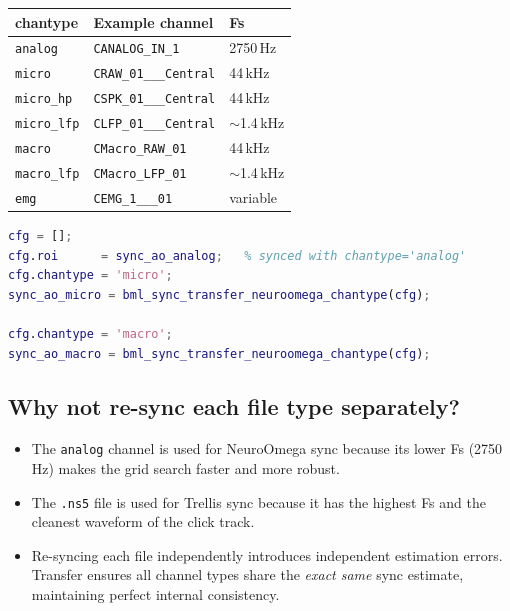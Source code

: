\documentclass[11pt, a4paper]{article}
\begin{document}
\begin{center}
\renewcommand{\arraystretch}{1.3}
\begin{tabular}{lll}
\toprule
\textbf{chantype} & \textbf{Example channel} & \textbf{Fs} \\
\midrule
\texttt{analog}    & \texttt{CANALOG\_IN\_1}         & 2750\,Hz \\
\texttt{micro}     & \texttt{CRAW\_01\_\_\_Central}  & 44\,kHz \\
\texttt{micro\_hp} & \texttt{CSPK\_01\_\_\_Central}  & 44\,kHz \\
\texttt{micro\_lfp}& \texttt{CLFP\_01\_\_\_Central}  & $\sim$1.4\,kHz \\
\texttt{macro}     & \texttt{CMacro\_RAW\_01}        & 44\,kHz \\
\texttt{macro\_lfp}& \texttt{CMacro\_LFP\_01}        & $\sim$1.4\,kHz \\
\texttt{emg}       & \texttt{CEMG\_1\_\_\_01}        & variable \\
\bottomrule
\end{tabular}
\end{center}

\begin{lstlisting}[language=Matlab]
cfg = [];
cfg.roi      = sync_ao_analog;   % synced with chantype='analog'
cfg.chantype = 'micro';
sync_ao_micro = bml_sync_transfer_neuroomega_chantype(cfg);

cfg.chantype = 'macro';
sync_ao_macro = bml_sync_transfer_neuroomega_chantype(cfg);
\end{lstlisting}

\subsection{Why not re-sync each file type separately?}

\begin{itemize}
  \item The \texttt{analog} channel is used for NeuroOmega sync because its lower Fs (2750\,Hz) makes the grid search faster and more robust.
  \item The \texttt{.ns5} file is used for Trellis sync because it has the highest Fs and the cleanest waveform of the click track.
  \item Re-syncing each file independently introduces independent estimation errors. Transfer ensures all channel types share the \emph{exact same} sync estimate, maintaining perfect internal consistency.
\end{itemize}
\end{document}
